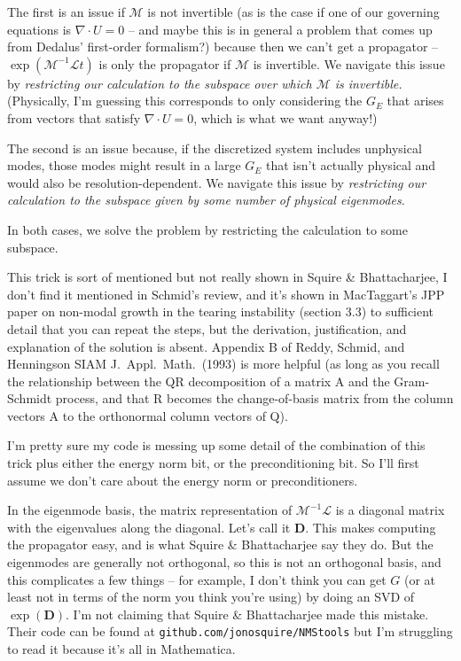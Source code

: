 \documentclass[aps,pop,preprint]{revtex4}
\begin{document}
The first is an issue if $\mathcal{M}$ is not invertible (as is the case if one of our governing equations is $\nabla \cdot U = 0$ -- and maybe this is in general a problem that comes up from Dedalus' first-order formalism?) because then we can't get a propagator -- $\exp(\mathcal{M}^{-1} \mathcal{L} t)$ is only the propagator if $\mathcal{M}$ is invertible. 
We navigate this issue by \textit{restricting our calculation to the subspace over which $\mathcal{M}$ is invertible.} 
(Physically, I'm guessing this corresponds to only considering the $G_E$ that arises from vectors that satisfy $\nabla \cdot U = 0$, which is what we want anyway!)

The second is an issue because, if the discretized system includes unphysical modes, those modes might result in a large $G_E$ that isn't actually physical and would also be resolution-dependent. 
We navigate this issue by \textit{restricting our calculation to the subspace given by some number of physical eigenmodes.}

In both cases, we solve the problem by restricting the calculation to some subspace. 

This trick is sort of mentioned but not really shown in Squire \& Bhattacharjee, I don't find it mentioned in Schmid's review, and it's shown in MacTaggart's JPP paper on non-modal growth in the tearing instability (section 3.3) to sufficient detail that you can repeat the steps, but the derivation, justification, and explanation of the solution is absent. 
Appendix B of Reddy, Schmid, and Henningson SIAM J.~Appl.~Math.~(1993) is more helpful (as long as you recall the relationship between the QR decomposition of a matrix A and the Gram-Schmidt process, and that R becomes the change-of-basis matrix from the column vectors A to the orthonormal column vectors of Q). 

I'm pretty sure my code is messing up some detail of the combination of this trick plus either the energy norm bit, or the preconditioning bit. 
So I'll first assume we don't care about the energy norm or preconditioners.

In the eigenmode basis, the matrix representation of $\mathcal{M}^{-1}\mathcal{L}$ is a diagonal matrix with the eigenvalues along the diagonal. 
Let's call it $\mathbf{D}$. 
This makes computing the propagator easy, and is what Squire \& Bhattacharjee say they do. 
But the eigenmodes are generally not orthogonal, so this is not an orthogonal basis, and this complicates a few things -- for example, I don't think you can get $G$ (or at least not in terms of the norm you think you're using) by doing an SVD of $\exp(\mathbf{D})$. 
I'm not claiming that Squire \& Bhattacharjee made this mistake. 
Their code can be found at \texttt{github.com/jonosquire/NMStools} but I'm struggling to read it because it's all in Mathematica.
\end{document}
